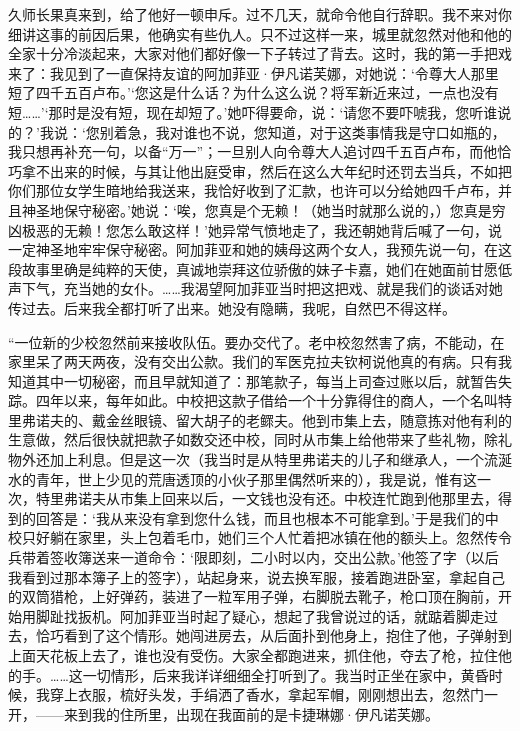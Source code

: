 久师长果真来到，给了他好一顿申斥。过不几天，就命令他自行辞职。我不来对你细讲这事的前因后果，他确实有些仇人。只不过这样一来，城里就忽然对他和他的全家十分冷淡起来，大家对他们都好像一下子转过了背去。这时，我的第一手把戏来了：我见到了一直保持友谊的阿加菲亚·伊凡诺芙娜，对她说：‘令尊大人那里短了四千五百卢布。’‘您这是什么话？为什么这么说？将军新近来过，一点也没有短……’‘那时是没有短，现在却短了。’她吓得要命，说：‘请您不要吓唬我，您听谁说的？’我说：‘您别着急，我对谁也不说，您知道，对于这类事情我是守口如瓶的，我只想再补充一句，以备“万一”；一旦别人向令尊大人追讨四千五百卢布，而他恰巧拿不出来的时候，与其让他出庭受审，然后在这么大年纪时还罚去当兵，不如把你们那位女学生暗地给我送来，我恰好收到了汇款，也许可以分给她四千卢布，并且神圣地保守秘密。’她说：‘唉，您真是个无赖！（她当时就那么说的，）您真是穷凶极恶的无赖！您怎么敢这样！’她异常气愤地走了，我还朝她背后喊了一句，说一定神圣地牢牢保守秘密。阿加菲亚和她的姨母这两个女人，我预先说一句，在这段故事里确是纯粹的天使，真诚地崇拜这位骄傲的妹子卡嘉，她们在她面前甘愿低声下气，充当她的女仆。……我渴望阿加菲亚当时把这把戏、就是我们的谈话对她传过去。后来我全都打听了出来。她没有隐瞒，我呢，自然巴不得这样。
\par “一位新的少校忽然前来接收队伍。要办交代了。老中校忽然害了病，不能动，在家里呆了两天两夜，没有交出公款。我们的军医克拉夫钦柯说他真的有病。只有我知道其中一切秘密，而且早就知道了：那笔款子，每当上司查过账以后，就暂告失踪。四年以来，每年如此。中校把这款子借给一个十分靠得住的商人，一个名叫特里弗诺夫的、戴金丝眼镜、留大胡子的老鳏夫。他到市集上去，随意拣对他有利的生意做，然后很快就把款子如数交还中校，同时从市集上给他带来了些礼物，除礼物外还加上利息。但是这一次（我当时是从特里弗诺夫的儿子和继承人，一个流涎水的青年，世上少见的荒唐透顶的小伙子那里偶然听来的），我是说，惟有这一次，特里弗诺夫从市集上回来以后，一文钱也没有还。中校连忙跑到他那里去，得到的回答是：‘我从来没有拿到您什么钱，而且也根本不可能拿到。’于是我们的中校只好躺在家里，头上包着毛巾，她们三个人忙着把冰镇在他的额头上。忽然传令兵带着签收簿送来一道命令：‘限即刻，二小时以内，交出公款。’他签了字（以后我看到过那本簿子上的签字），站起身来，说去换军服，接着跑进卧室，拿起自己的双筒猎枪，上好弹药，装进了一粒军用子弹，右脚脱去靴子，枪口顶在胸前，开始用脚趾找扳机。阿加菲亚当时起了疑心，想起了我曾说过的话，就踮着脚走过去，恰巧看到了这个情形。她闯进房去，从后面扑到他身上，抱住了他，子弹射到上面天花板上去了，谁也没有受伤。大家全都跑进来，抓住他，夺去了枪，拉住他的手。……这一切情形，后来我详详细细全打听到了。我当时正坐在家中，黄昏时候，我穿上衣服，梳好头发，手绢洒了香水，拿起军帽，刚刚想出去，忽然门一开，——来到我的住所里，出现在我面前的是卡捷琳娜·伊凡诺芙娜。
